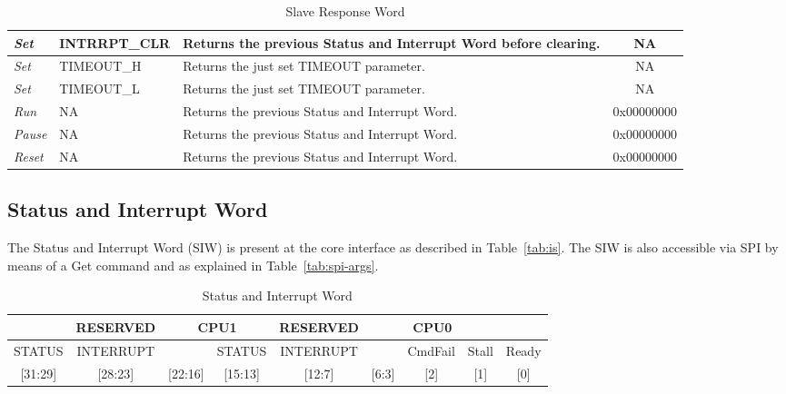 \documentclass{ug}
\theoremstyle{plain}
\begin{document}
\begin{table}[H]
\begin{center}
\begin{tabular}{|l|l|p{7cm}|c|}
      \rowcolor{iob-blue}
      \textit{Set} & INTRRPT\_CLR & Returns the previous Status and Interrupt
      Word before clearing. & NA\\ \hline

      \textit{Set} & TIMEOUT\_H & Returns the just set TIMEOUT parameter.
      & NA\\ \hline \hline \hline

      \rowcolor{iob-blue}
      \textit{Set} & TIMEOUT\_L & Returns the just set TIMEOUT parameter.
      & NA\\ \hline \hline \hline

      \textit{Run} & NA & Returns the previous Status and Interrupt Word. &
      0x00000000\\ \hline

      \rowcolor{iob-blue}
      \textit{Pause} & NA & Returns the previous Status and
      Interrupt Word. & 0x00000000\\ \hline

      \textit{Reset} & NA & Returns the previous Status and Interrupt Word. &
      0x00000000\\ \hline

    \end{tabular}
    \caption{Slave Response Word}
    \label{tab:spi-resp}
  \end{center}
\end{table}
\clearpage

\subsection{Status and Interrupt Word}

The Status and Interrupt Word (SIW) is present at the core interface
as described in Table~\ref{tab:is}. The SIW is also accessible via SPI
by means of a Get command and as explained in
Table~\ref{tab:spi-args}.

\begin{table}[H]
  \begin{center}
    \begin{tabular}{|c|c|c|c|c|c|c|c|c|}
      \hline
      \hline
      \rowcolor{iob-green}
      \multicolumn{2}{|c|}{\textbf{CPU2}} & \textbf{RESERVED} & \multicolumn{2}{|c|}{\textbf{CPU1}} & \textbf{RESERVED} &  \multicolumn{3}{|c|}{\textbf{CPU0}}   \\
      \hline
      \hline
      STATUS  & INTERRUPT &         & STATUS   & INTERRUPT &      & CmdFail          & Stall    &  Ready \\
      {[31:29]} & {[28:23]}   & \multirow{-2}{*}{[22:16]} & [15:13]  & [12:7]    & \multirow{-2}{*}{[6:3]}&  [2]    & [1]       &  [0]   \\
      \hline
      \hline
    \end{tabular}
    \caption{Status and Interrupt Word}
    \label{tab:si}
  \end{center}
\end{table}
\end{document}
